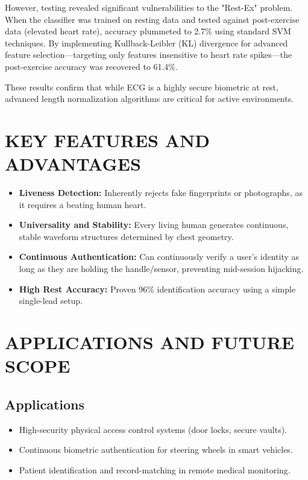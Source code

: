 \documentclass[12pt,a4paper]{report}
\begin{document}
However, testing revealed significant vulnerabilities to the "Rest-Ex" problem. When the classifier was trained on resting data and tested against post-exercise data (elevated heart rate), accuracy plummeted to 2.7\% using standard SVM techniques. By implementing Kullback-Leibler (KL) divergence for advanced feature selection—targeting only features insensitive to heart rate spikes—the post-exercise accuracy was recovered to 61.4\%. 

These results confirm that while ECG is a highly secure biometric at rest, advanced length normalization algorithms are critical for active environments.

\chapter{KEY FEATURES AND ADVANTAGES}
\begin{itemize}
    \item \textbf{Liveness Detection:} Inherently rejects fake fingerprints or photographs, as it requires a beating human heart.
    \item \textbf{Universality and Stability:} Every living human generates continuous, stable waveform structures determined by chest geometry.
    \item \textbf{Continuous Authentication:} Can continuously verify a user's identity as long as they are holding the handle/sensor, preventing mid-session hijacking.
    \item \textbf{High Rest Accuracy:} Proven 96\% identification accuracy using a simple single-lead setup.
\end{itemize}

\chapter{APPLICATIONS AND FUTURE SCOPE}
\section{Applications}
\begin{itemize}
    \item High-security physical access control systems (door locks, secure vaults).
    \item Continuous biometric authentication for steering wheels in smart vehicles.
    \item Patient identification and record-matching in remote medical monitoring.
\end{itemize}
\end{document}
